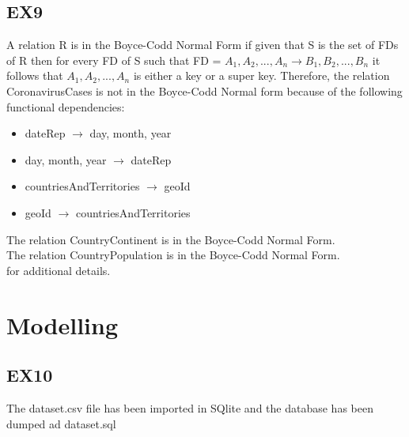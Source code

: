 \documentclass{article}
\begin{document}
\subsection{EX9}
 A relation R is in the Boyce-Codd Normal Form if given that S is the set of FDs of R then for every FD of S such that FD = $A_1,A_2,...,A_n \rightarrow B_1,B_2,...,B_n$ it follows that $A_1,A_2,...,A_n$ is either a key or a super key. Therefore, the relation CoronavirusCases is not in the Boyce-Codd Normal form because of the following functional dependencies:
\begin{multicols}{2}
\begin{itemize}
    \item dateRep $\rightarrow$ day, month, year
    \item day, month, year $\rightarrow$ dateRep
    \item countriesAndTerritories $\rightarrow$ geoId
    \item geoId $\rightarrow$ countriesAndTerritories
\end{itemize}
\end{multicols}
The relation CountryContinent is in the Boyce-Codd Normal Form.\\
The relation CountryPopulation is in the Boyce-Codd Normal Form.\\
\textcolor{blue}{} for additional details.
\section{Modelling}
\subsection{EX10}The dataset.csv file has been imported in SQlite and the database has been dumped ad dataset.sql
\end{document}
